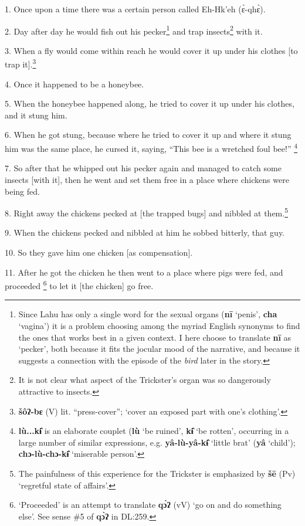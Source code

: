\setcounter{footnote}{0}

1. Once upon a time there was a certain person called Eh-Hk'eh (ɛ̀-qhɛ̀).

2. Day after day he would fish out his pecker\footnote{Since Lahu has only a single word for the sexual organs (\textbf{nī} `penis', \textbf{cha} `vagina') it is a problem choosing among the myriad English synonyms to find the ones that works best in a given context. I here choose to translate \textbf{nī} as `pecker', both because it fits the jocular mood of the narrative, and because it suggests a connection with the episode of the \textit{bird} later in the story.} and trap insects\footnote{It is not clear what aspect of the Trickster's organ was so dangerously attractive to insects.} with it.

3. When a fly would come within reach he would cover it up under his clothes [to
trap it].\footnote{\textbf{šôʔ-bɛ} (V) lit. ``press-cover''; `cover an exposed part with one's clothing'.}

4. Once it happened to be a honeybee.

5. When the honeybee happened along, he tried to cover it up under his clothes,
and it stung him.

6. When he got stung, because where he tried to cover it up and where it stung
him was the same place, he cursed it, saying, ``This bee is a wretched foul bee!''
\footnote{\textbf{lù...kɨ̂} is an elaborate couplet (\textbf{lù} `be ruined', \textbf{kɨ̂} `be rotten', occurring in a large number of similar expressions, e.g. \textbf{yâ-lù-yâ-kɨ̂} `little brat' (\textbf{yâ} `child'); \textbf{chɔ-lù-chɔ-kɨ̂} `miserable person'.}

7. So after that he whipped out his pecker again and managed to catch some insects
[with it], then he went and set them free in a place where chickens were being
fed.

8. Right away the chickens pecked at [the trapped bugs] and nibbled at them.\footnote{The painfulness of this experience for the Trickster is emphasized by \textbf{šē} (Pv) `regretful state of affairs'.}

9. When the chickens pecked and nibbled at him he sobbed bitterly, that guy.

10. So they gave him one chicken [as compensation].

11. After he got the chicken he then went to a place where pigs were fed, and proceeded
\footnote{`Proceeded' is an attempt to translate \textbf{qɔ̀ʔ} (vV) `go on and do something else'. See sense \#5 of \textbf{qɔ̀ʔ} in DL:259.} to let it [the chicken] go free.

